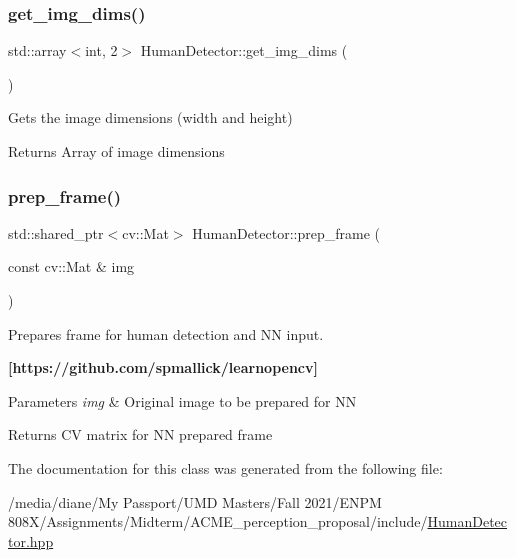 \subsubsection{\texorpdfstring{get\+\_\+img\+\_\+dims()}{get\_img\_dims()}}
{\footnotesize\ttfamily std\+::array$<$int, 2$>$ Human\+Detector\+::get\+\_\+img\+\_\+dims (\begin{DoxyParamCaption}{ }\end{DoxyParamCaption})}



Gets the image dimensions (width and height) 

\begin{DoxyReturn}{Returns}
Array of image dimensions 
\end{DoxyReturn}
\mbox{\label{class_human_detector_a32ae85763d07da7611f739cea9988308}} 
\subsubsection{\texorpdfstring{prep\+\_\+frame()}{prep\_frame()}}
{\footnotesize\ttfamily std\+::shared\+\_\+ptr$<$cv\+::\+Mat$>$ Human\+Detector\+::prep\+\_\+frame (\begin{DoxyParamCaption}\item[{const cv\+::\+Mat \&}]{img }\end{DoxyParamCaption})}



Prepares frame for human detection and NN input. 

{\bfseries [https\+://github.\+com/spmallick/learnopencv]}


\begin{DoxyParams}{Parameters}
{\em img} & Original image to be prepared for NN \\
\hline
\end{DoxyParams}
\begin{DoxyReturn}{Returns}
CV matrix for NN prepared frame 
\end{DoxyReturn}


The documentation for this class was generated from the following file\+:\begin{DoxyCompactItemize}
\item 
/media/diane/\+My Passport/\+U\+M\+D Masters/\+Fall 2021/\+E\+N\+P\+M 808\+X/\+Assignments/\+Midterm/\+A\+C\+M\+E\+\_\+perception\+\_\+proposal/include/\hyperlink{_human_detector_8hpp}{Human\+Detector.\+hpp}\end{DoxyCompactItemize}
